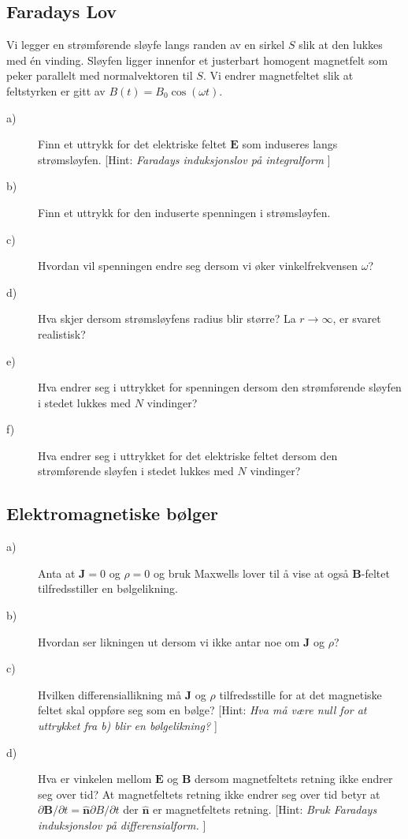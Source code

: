 \documentclass[twoside,utf8]{article}
\begin{document}
\subsection{Faradays Lov}
Vi legger en strømførende sløyfe langs randen av en sirkel $S$ slik at den lukkes med én vinding.
Sløyfen ligger innenfor et justerbart homogent magnetfelt som peker parallelt med normalvektoren til $S$.
Vi endrer magnetfeltet slik at feltstyrken er gitt av $B(t)=B_0 \cos (\omega t)$.
\begin{description}
	\item[a)] Finn et uttrykk for det elektriske feltet $\mathbf{E}$ som induseres langs strømsløyfen.
		[Hint: {\it Faradays induksjonslov på integralform }]
	\item[b)] Finn et uttrykk for den induserte spenningen i strømsløyfen.
	\item[c)] Hvordan vil spenningen endre seg dersom vi øker vinkelfrekvensen $\omega$?
	\item[d)] Hva skjer dersom strømsløyfens radius blir større? La $r\rightarrow \infty$, er svaret realistisk?
	\item[e)] Hva endrer seg i uttrykket for spenningen dersom den strømførende sløyfen i stedet lukkes med $N$ vindinger?
	\item[f)] Hva endrer seg i uttrykket for det elektriske feltet dersom den strømførende sløyfen i stedet lukkes med $N$ vindinger?
\end{description}




\subsection{Elektromagnetiske bølger}
\begin{description}
	\item[a)] Anta at $\mathbf{J}=0$ og $\rho=0$ og bruk Maxwells lover til å vise at også $\mathbf{B}$-feltet tilfredsstiller en bølgelikning.
	\item[b)] Hvordan ser likningen ut dersom vi ikke antar noe om $\mathbf{J}$ og $\rho$?
	\item[c)] Hvilken differensiallikning må $\mathbf{J}$ og $\rho$ tilfredsstille for at det magnetiske feltet skal oppføre seg som en bølge?
		[Hint: {\it Hva må være null for at uttrykket fra b) blir en bølgelikning? }]
	\item[d)] Hva er vinkelen mellom $\mathbf{E}$ og $\mathbf{B}$ dersom magnetfeltets retning ikke endrer seg over tid? At magnetfeltets retning ikke endrer seg over tid betyr at $\partial \mathbf{B}/\partial t = \hat{\mathbf{n}} \partial B/\partial t$ der $\hat{\mathbf{n}}$ er magnetfeltets retning.
		[Hint: {\it Bruk Faradays induksjonslov på differensialform. }]
\end{description}
\end{document}
